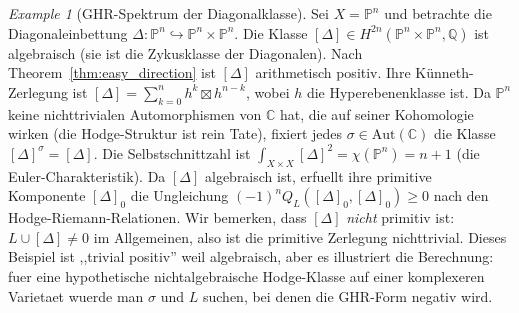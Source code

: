\documentclass[aps,prd,twocolumn,superscriptaddress,nofootinbib]{revtex4-2}
\theoremstyle{definition}
\theoremstyle{remark}
\newtheorem{example}[theorem]{Example}
\begin{document}
\begin{example}[GHR-Spektrum der Diagonalklasse]
\label{ex:diagonal}
Sei $X = \mathbb{P}^n$ und betrachte die Diagonaleinbettung $\Delta: \mathbb{P}^n \hookrightarrow \mathbb{P}^n \times \mathbb{P}^n$. Die Klasse $[\Delta] \in H^{2n}(\mathbb{P}^n \times \mathbb{P}^n, \mathbb{Q})$ ist algebraisch (sie ist die Zykusklasse der Diagonalen). Nach Theorem~\ref{thm:easy_direction} ist $[\Delta]$ arithmetisch positiv. Ihre K\"unneth-Zerlegung ist $[\Delta] = \sum_{k=0}^n h^k \boxtimes h^{n-k}$, wobei $h$ die Hyperebenenklasse ist. Da $\mathbb{P}^n$ keine nichttrivialen Automorphismen von $\mathbb{C}$ hat, die auf seiner Kohomologie wirken (die Hodge-Struktur ist rein Tate), fixiert jedes $\sigma \in \mathrm{Aut}(\mathbb{C})$ die Klasse $[\Delta]^\sigma = [\Delta]$. Die Selbstschnittzahl ist $\int_{X \times X} [\Delta]^2 = \chi(\mathbb{P}^n) = n + 1$ (die Euler-Charakteristik). Da $[\Delta]$ algebraisch ist, erfuellt ihre primitive Komponente $[\Delta]_0$ die Ungleichung $(-1)^n Q_L([\Delta]_0, [\Delta]_0) \geq 0$ nach den Hodge-Riemann-Relationen. Wir bemerken, dass $[\Delta]$ \emph{nicht} primitiv ist: $L \cup [\Delta] \neq 0$ im Allgemeinen, also ist die primitive Zerlegung nichttrivial. Dieses Beispiel ist ,,trivial positiv'' weil algebraisch, aber es illustriert die Berechnung: fuer eine hypothetische nichtalgebraische Hodge-Klasse auf einer komplexeren Varietaet wuerde man $\sigma$ und $L$ suchen, bei denen die GHR-Form negativ wird.
\end{example}
\end{document}
